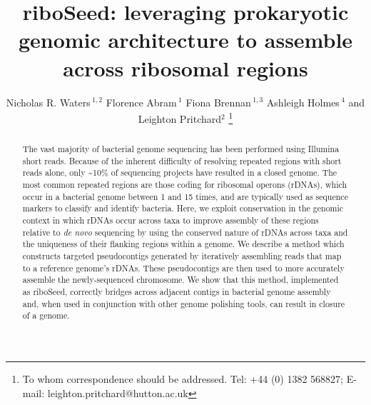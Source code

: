 \documentclass[a4,center,fleqn]{NAR}
\begin{document}
\title{riboSeed: leveraging prokaryotic genomic architecture to assemble across ribosomal regions}

\author{%
  Nicholas R. Waters\,$^{1,2}$
  Florence Abram\,$^{1}$
  Fiona Brennan\,$^{1,3}$
  Ashleigh Holmes\,$^{4}$
  and Leighton Pritchard$^{2}$
  \footnote{To whom correspondence should be addressed.
      Tel: +44 (0) 1382 568827; E-mail: leighton.pritchard@hutton.ac.uk
  }
}
\address{
  $^{1}$Department of Microbiology, School of Natural Sciences, National University of Ireland, Galway, Ireland \\
  $^{2}$Information and Computational Sciences, James Hutton Institute, Invergowrie, Dundee DD2 5DA, Scotland\\
  $^{3}$Soil and Environmental Microbiology, Environmental Research Centre, Teagasc, Johnstown Castle, Wexford, Ireland\\
  $^{4}$Cell and Molecular Sciences, James Hutton Institute, Invergowrie, Dundee DD2 5DA, Scotland\\
}


\maketitle

\begin{abstract}
The vast majority of bacterial genome sequencing has been performed using Illumina short reads. Because of the inherent difficulty of resolving repeated regions with short reads alone, only \textasciitilde10\% of sequencing projects have resulted in a closed genome. The most common repeated regions are those coding for ribosomal operons (rDNAs), which occur in a bacterial genome between 1 and 15 times, and are typically used as sequence markers to classify and identify bacteria. Here, we exploit conservation in the genomic context in which rDNAs occur across taxa to improve assembly of these regions relative to \textit{de novo} sequencing by using the conserved nature of rDNAs across taxa and the uniqueness of their flanking regions within a genome. We describe a method which constructs targeted pseudocontigs generated by iteratively assembling reads that map to a reference genome's rDNAs. These pseudocontigs are then used to more accurately assemble the newly-sequenced chromosome. We show that this method, implemented as riboSeed, correctly bridges across adjacent contigs in bacterial genome assembly and, when used in conjunction with other genome polishing tools, can result in closure of a genome.
\end{abstract}
\end{document}
